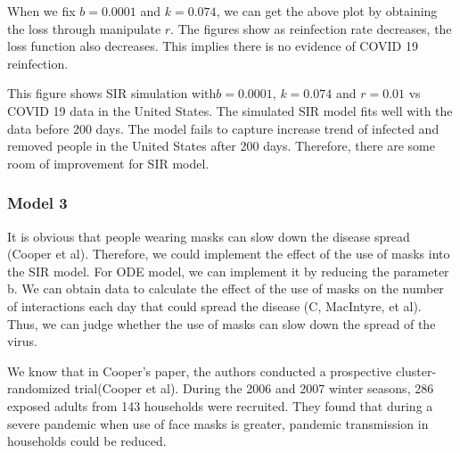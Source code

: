 \documentclass[11pt,a4paper]{article}
\begin{document}

\medskip \noindent
When we fix $b=0.0001$ and $k=0.074$, we can get the above plot by obtaining the loss through manipulate $r$. The figures show as reinfection rate decreases, the loss function also decreases. This implies there is no evidence of COVID 19 reinfection.
\medskip \noindent





\medskip \noindent
This figure shows SIR simulation with$b=0.0001$, $k=0.074$ and $r=0.01$ vs COVID 19 data in the United States. The simulated SIR model fits well with the data before 200 days. The model fails to capture increase trend of infected and removed people in the United States after 200 days. Therefore, there are some room of improvement for SIR model.

\subsubsection*{Model 3}
It is obvious that people wearing masks can slow down the disease spread (Cooper et al). Therefore, we could implement the effect of the use of masks into the SIR model. For ODE model, we can implement it by reducing the parameter b. We can obtain data to calculate the effect of the use of masks on the number of interactions each day that could spread the disease (C, MacIntyre, et al). Thus, we can judge whether the use of masks can slow down the spread of the virus.

\medskip \noindent
We know that in Cooper’s paper, the authors conducted a prospective cluster-randomized trial(Cooper et al). During the 2006 and 2007 winter seasons, 286 exposed adults from 143 households were recruited. They found that during a severe pandemic when use of face masks is greater, pandemic transmission in households could be reduced.
\end{document}
